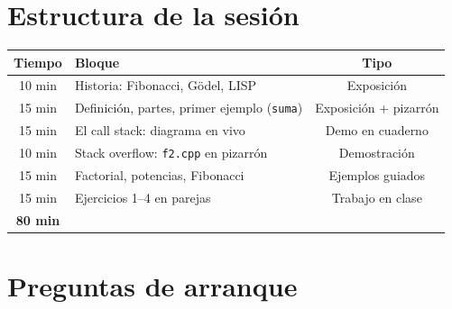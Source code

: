 \documentclass[12pt, oneside]{article}
\begin{document}

\tableofcontents
\newpage

\section{Estructura de la sesión}

\begin{center}
\begin{tabular}{clc}
  \toprule
  \textbf{Tiempo} & \textbf{Bloque} & \textbf{Tipo} \\
  \midrule
  10 min & Historia: Fibonacci, Gödel, LISP & Exposición \\
  15 min & Definición, partes, primer ejemplo (\texttt{suma}) & Exposición + pizarrón \\
  15 min & El call stack: diagrama en vivo & Demo en cuaderno \\
  10 min & Stack overflow: \texttt{f2.cpp} en pizarrón & Demostración \\
  15 min & Factorial, potencias, Fibonacci & Ejemplos guiados \\
  15 min & Ejercicios 1--4 en parejas & Trabajo en clase \\
  \midrule
  \textbf{80 min} & & \\
  \bottomrule
\end{tabular}
\end{center}

\section{Preguntas de arranque}
\end{document}
